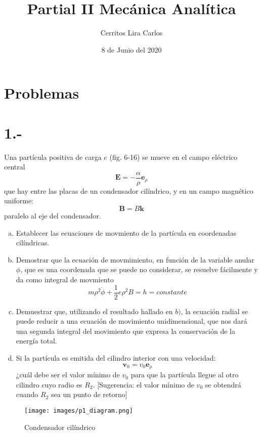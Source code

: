 \documentclass{article}
\title{Partial II Mecánica Analítica}
\author{Cerritos Lira Carlos}
\date{8 de Junio del 2020}
\begin{document}
\maketitle
\section*{Problemas}
\section*{1.-}
Una partícula positiva de carga $e$ (fig. 6-16) se mueve en el campo eléctrico central
\[ \bm{E} = -\frac{\alpha}{\rho} \bm{e}_{\rho} \]
que hay entre las placas de un condensador cilíndrico, y en un campo magnético uniforme:
\[ \bm{B} = B\bm{k} \]
paralelo al eje del condensador.
\begin{enumerate}[a)]
    \item Establecer las ecuaciones de movmiento de la partícula en coordenadas cilíndricas.
    \item Demostrar que la ecuación de movmimiento, en función de la variable anular $\phi$, que es 
    una coordenada que se puede no considerar, se resuelve fácilmente y da como integral de movmiento 
    \[ m\rho^2\dot{\phi} + \frac{1}{2}e\rho^2B = h = constante \]
    \item Demuestrar que, utilizando el resultado hallado en $b)$, la ecuación radial se puede 
    reducir a una ecuación de movimiento unidimensional, que nos dará una segunda integral del movimiento 
    que expresa la conservación de la energía total. 
    \item Si la partícula es emitida del cilindro interior con una velocidad:
    \[ \bm{v}_0 = v_0\bm{e}_\rho \]
    ¿cuál debe ser el valor mínimo de $v_0$ para que la partícula llegue al otro cilindro cuyo radio es $R_2$.
    [Sugerencia: el valor mínimo de $v_0$ se obtendrá cuando $R_2$ sea un punto de retorno]
\end{enumerate}
\begin{figure}[H]
    \centering
    \texttt{[image: images/p1\_diagram.png]}
    \caption{Condensador cilíndrico}
\end{figure}
\end{document}
